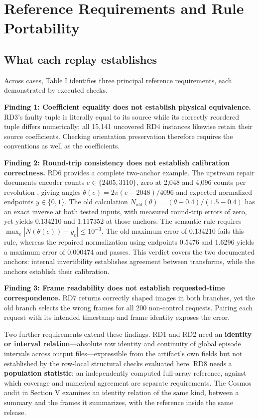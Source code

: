 \documentclass[conference]{IEEEtran}
\begin{document}
\section{Reference Requirements and Rule Portability}

\subsection{What each replay establishes}

Across cases, Table I identifies three principal reference requirements, each demonstrated by executed checks.\par

\textbf{Finding 1: Coefficient equality does not establish physical equivalence.} RD3's faulty tuple is literally equal to its source while its correctly reordered tuple differs numerically; all 15,141 uncovered RD4 instances likewise retain their source coefficients. Checking orientation preservation therefore requires the conventions as well as the coefficients.\par

\textbf{Finding 2: Round-trip consistency does not establish calibration correctness.} RD6 provides a complete two-anchor example. The upstream repair documents encoder counts \(e\in\{2405,3110\}\), zero at 2,048 and 4,096 counts per revolution \cite{6}, giving angles \(\theta(e)=2\pi(e-2048)/4096\) and expected normalized endpoints \(y\in\{0,1\}\). The old calculation \(N_{\mathrm{old}}(\theta)=(\theta-0.4)/(1.5-0.4)\) has an exact inverse at both tested inputs, with measured round-trip errors of zero, yet yields 0.134210 and 1.117352 at those anchors. The semantic rule requires \(\max_e |N(\theta(e))-y_e|\leq 10^{-3}\). The old maximum error of 0.134210 fails this rule, whereas the repaired normalization using endpoints 0.5476 and 1.6296 yields a maximum error of 0.000474 and passes. This verdict covers the two documented anchors: internal invertibility establishes agreement between transforms, while the anchors establish their calibration.\par

\textbf{Finding 3: Frame readability does not establish requested-time correspondence.} RD7 returns correctly shaped images in both branches, yet the old branch selects the wrong frames for all 200 non-control requests. Pairing each request with its intended timestamp and frame identity exposes the error.\par

Two further requirements extend these findings. RD1 and RD2 need an \textbf{identity or interval relation}---absolute row identity and continuity of global episode intervals across output files---expressible from the artifact's own fields but not established by the row-local structural checks evaluated here. RD8 needs a \textbf{population statistic}: an independently computed full-array reference, against which coverage and numerical agreement are separate requirements. The Cosmos audit in Section V examines an identity relation of the same kind, between a summary and the frames it summarizes, with the reference inside the same release.\par
\end{document}
